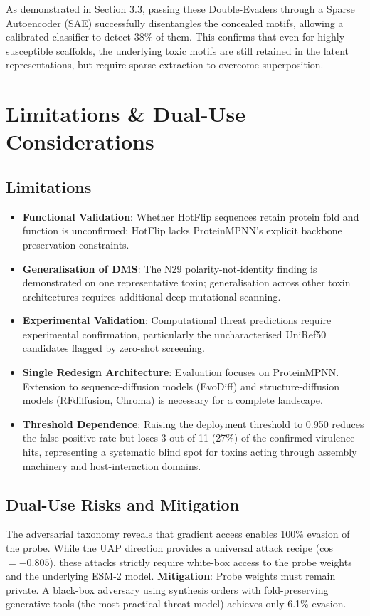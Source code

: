 \documentclass[11pt,a4paper]{article}
\begin{document}
As demonstrated in Section 3.3, passing these Double-Evaders through a Sparse Autoencoder (SAE) successfully disentangles the concealed motifs, allowing a calibrated classifier to detect 38\% of them. This confirms that even for highly susceptible scaffolds, the underlying toxic motifs are still retained in the latent representations, but require sparse extraction to overcome superposition.

\section{Limitations \& Dual-Use Considerations}

\subsection*{Limitations}
\begin{itemize}
    \item \textbf{Functional Validation}: Whether HotFlip sequences retain protein fold and function is unconfirmed; HotFlip lacks ProteinMPNN's explicit backbone preservation constraints.
    \item \textbf{Generalisation of DMS}: The N29 polarity-not-identity finding is demonstrated on one representative toxin; generalisation across other toxin architectures requires additional deep mutational scanning.
    \item \textbf{Experimental Validation}: Computational threat predictions require experimental confirmation, particularly the uncharacterised UniRef50 candidates flagged by zero-shot screening.
    \item \textbf{Single Redesign Architecture}: Evaluation focuses on ProteinMPNN. Extension to sequence-diffusion models (EvoDiff) and structure-diffusion models (RFdiffusion, Chroma) is necessary for a complete landscape.
    \item \textbf{Threshold Dependence}: Raising the deployment threshold to 0.950 reduces the false positive rate but loses 3 out of 11 (27\%) of the confirmed virulence hits, representing a systematic blind spot for toxins acting through assembly machinery and host-interaction domains.
\end{itemize}

\subsection*{Dual-Use Risks and Mitigation}
The adversarial taxonomy reveals that gradient access enables 100\% evasion of the probe. While the UAP direction provides a universal attack recipe (cos $= -0.805$), these attacks strictly require white-box access to the probe weights and the underlying ESM-2 model. \textbf{Mitigation}: Probe weights must remain private. A black-box adversary using synthesis orders with fold-preserving generative tools (the most practical threat model) achieves only 6.1\% evasion.
\end{document}
